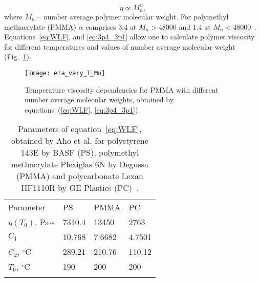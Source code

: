 \begin{equation} \label{eq:3p4_3p1}
	\eta \propto M_n^\alpha,
\end{equation}
where $M_n$ -- number average polymer molecular weight. For polymethyl methacrylate (PMMA) $\alpha$ comprises 3.4 at $M_n > 48000$ and 1.4 at $M_n < 48000$~\cite{Leveder_2010,Bueche_3p4_1p4}.
Equations~\ref{eq:WLF}, and \ref{eq:3p4_3p1} allow one to calculate polymer viscosity for different temperatures and values of number average molecular weight (Fig.~\ref{fig:eta_vary_T_Mn}).

\begin{figure}
	\begin{center}
		\texttt{[image: eta\_vary\_T\_Mn]}
	\end{center}
	\vspace{-2em}
	\caption{Temperature viscosity dependencies for PMMA with different number average molecular weights, obtained by equations~(\ref{eq:WLF}, \ref{eq:3p4_3p1}).}
	\label{fig:eta_vary_T_Mn}
\end{figure}

\begin{table}[t]
	\centering
	\caption{Parameters of equation~\ref{eq:WLF}, obtained by Aho et al. for polystyrene 143E by BASF (PS), polymethyl methacrylate Plexiglas 6N by Degussa (PMMA) and polycarbonate Lexan HF1110R by GE Plastics (PC)~\cite{Aho_WLF}.}
	\begin{tabular}{@{}llll}
		\br
		Parameter \hspace{8.9em} & PS \hspace{5em} & PMMA \hspace{5em} & PC \\
		\mr
		$\eta(T_0)$, Pa$\cdot$s \hspace{8.9em} & 7310.4 \hspace{5em} & 13450 \hspace{5em} & 2763 \\
		$C_1$ \hspace{8.9em} & 10.768 \hspace{5em} & 7.6682 \hspace{5em} & 4.7501 \\
		$C_2$, $^\circ$C \hspace{8.9em} & 289.21 \hspace{5em} & 210.76 \hspace{5em} & 110.12 \\
		$T_0$, $^\circ$C \hspace{8.9em} & 190 \hspace{5em} & 200 \hspace{5em} & 200 \\
		\br
	\end{tabular}
	\label{table:WLF}
\end{table}

